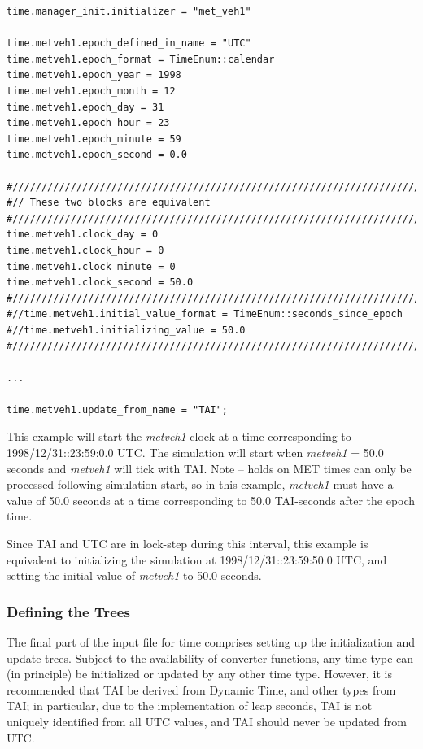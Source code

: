 \begin{verbatim}
time.manager_init.initializer = "met_veh1"

time.metveh1.epoch_defined_in_name = "UTC"
time.metveh1.epoch_format = TimeEnum::calendar
time.metveh1.epoch_year = 1998
time.metveh1.epoch_month = 12
time.metveh1.epoch_day = 31
time.metveh1.epoch_hour = 23
time.metveh1.epoch_minute = 59
time.metveh1.epoch_second = 0.0

#///////////////////////////////////////////////////////////////////////
#// These two blocks are equivalent
#///////////////////////////////////////////////////////////////////////
time.metveh1.clock_day = 0
time.metveh1.clock_hour = 0
time.metveh1.clock_minute = 0
time.metveh1.clock_second = 50.0
#///////////////////////////////////////////////////////////////////////
#//time.metveh1.initial_value_format = TimeEnum::seconds_since_epoch
#//time.metveh1.initializing_value = 50.0
#///////////////////////////////////////////////////////////////////////

...

time.metveh1.update_from_name = "TAI";
\end{verbatim}
This example will start the \textit{metveh1} clock at a time corresponding to
1998/12/31::23:59:0.0 UTC.
The simulation will start when \textit{metveh1} = 50.0 seconds and
\textit{metveh1} will tick with TAI.
Note -- holds on MET
times can only be processed following simulation start, so in this example,
\textit{metveh1}
must have a value of 50.0 seconds at a time corresponding to 50.0 TAI-seconds
after the epoch time.

Since TAI and UTC are in lock-step during this interval, this example
is equivalent to
initializing the simulation at 1998/12/31::23:59:50.0 UTC, and setting the
initial value of \textit{metveh1} to 50.0 seconds.



\subsubsection{Defining the Trees}
The final part of the input file for time comprises setting up the
initialization and update trees.  Subject to the availability of
converter functions, any time type can (in principle) be initialized or
updated by any other time type.  However, it is recommended that TAI be
derived from Dynamic Time, and other types from TAI; in particular, due to
the implementation of leap seconds, TAI is not uniquely identified from all
UTC values, and TAI should never be updated from UTC.

